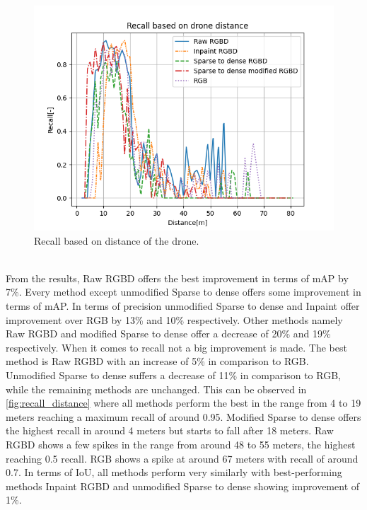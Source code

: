 \documentclass[twoside]{ctuthesis}
\theoremstyle{plain}
\theoremstyle{definition}
\theoremstyle{note}
\begin{document}
\begin{figure}
	\centering
	\includegraphics[width=\textwidth]{recall_distance.png}
	\caption{Recall based on distance of the drone.} \label{fig:recall_distance}
\end{figure}\\
From the results, Raw RGBD offers the best improvement in terms of mAP by 7\%. Every method except unmodified Sparse to dense offers some improvement in terms of mAP. In terms of precision unmodified Sparse to dense and Inpaint offer improvement over RGB by 13\% and 10\% respectively. Other methods namely Raw RGBD and modified Sparse to dense offer a decrease of 20\% and 19\% respectively. When it comes to recall not a big improvement is made. The best method is Raw RGBD with an increase of 5\% in comparison to RGB. Unmodified Sparse to dense suffers a decrease of 11\% in comparison to RGB, while the remaining methods are unchanged. This can be observed in \autoref{fig:recall_distance} where all methods perform the best in the range from 4 to 19 meters reaching a maximum recall of around 0.95. Modified Sparse to dense offers the highest recall in around 4 meters but starts to fall after 18 meters. Raw RGBD shows a few spikes in the range from around 48 to 55 meters, the highest reaching 0.5 recall. RGB shows a spike at around 67 meters with recall of around 0.7. In terms of IoU, all methods perform very similarly with best-performing methods Inpaint RGBD and unmodified Sparse to dense showing improvement of 1\%.
\pagebreak
\end{document}
